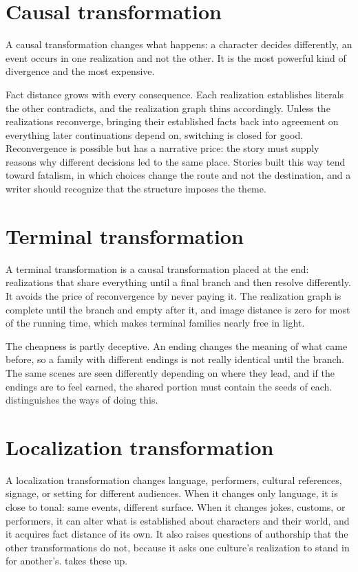 \section{Causal transformation}

A causal transformation changes what happens: a character decides differently, an event occurs in one realization and not the other. It is the most powerful kind of divergence and the most expensive.

Fact distance grows with every consequence. Each realization establishes literals the other contradicts, and the realization graph thins accordingly. Unless the realizations reconverge, bringing their established facts back into agreement on everything later continuations depend on, switching is closed for good. Reconvergence is possible but has a narrative price: the story must supply reasons why different decisions led to the same place. Stories built this way tend toward fatalism, in which choices change the route and not the destination, and a writer should recognize that the structure imposes the theme.

\section{Terminal transformation}

A terminal transformation is a causal transformation placed at the end: realizations that share everything until a final branch and then resolve differently. It avoids the price of reconvergence by never paying it. The realization graph is complete until the branch and empty after it, and image distance is zero for most of the running time, which makes terminal families nearly free in light.

The cheapness is partly deceptive. An ending changes the meaning of what came before, so a family with different endings is not really identical until the branch. The same scenes are seen differently depending on where they lead, and if the endings are to feel earned, the shared portion must contain the seeds of each.  distinguishes the ways of doing this.

\section{Localization transformation}

A localization transformation changes language, performers, cultural references, signage, or setting for different audiences. When it changes only language, it is close to tonal: same events, different surface. When it changes jokes, customs, or performers, it can alter what is established about characters and their world, and it acquires fact distance of its own. It also raises questions of authorship that the other transformations do not, because it asks one culture's realization to stand in for another's.  takes these up.


